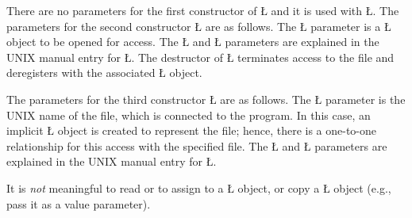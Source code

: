 \documentclass[openright,twoside]{report}
\begin{document}
There are no parameters for the first constructor of \LGinlinetrue\LGbegin\lgrinde\L{}\endlgrinde\LGend{} and it is used with \LGinlinetrue\LGbegin\lgrinde\L{}\endlgrinde\LGend{}.
The parameters for the second constructor \LGinlinetrue\LGbegin\lgrinde\L{}\endlgrinde\LGend{} are as follows.
The \LGinlinetrue\LGbegin\lgrinde\L{}\endlgrinde\LGend{} parameter is a \LGinlinetrue\LGbegin\lgrinde\L{}\endlgrinde\LGend{} object to be opened for access.
The \LGinlinetrue\LGbegin\lgrinde\L{}\endlgrinde\LGend{} and \LGinlinetrue\LGbegin\lgrinde\L{}\endlgrinde\LGend{} parameters are explained in the UNIX manual entry for \LGinlinetrue\LGbegin\lgrinde\L{}\endlgrinde\LGend{}.
The destructor of \LGinlinetrue\LGbegin\lgrinde\L{}\endlgrinde\LGend{} terminates access to the file and deregisters with the associated \LGinlinetrue\LGbegin\lgrinde\L{}\endlgrinde\LGend{} object.

The parameters for the third constructor \LGinlinetrue\LGbegin\lgrinde\L{}\endlgrinde\LGend{} are as follows.
The \LGinlinetrue\LGbegin\lgrinde\L{}\endlgrinde\LGend{} parameter is the UNIX name of the file, which is connected to the program.
In this case, an implicit \LGinlinetrue\LGbegin\lgrinde\L{}\endlgrinde\LGend{} object is created to represent the file;
hence, there is a one-to-one relationship for this access with the specified file.
The \LGinlinetrue\LGbegin\lgrinde\L{}\endlgrinde\LGend{} and \LGinlinetrue\LGbegin\lgrinde\L{}\endlgrinde\LGend{} parameters are explained in the UNIX manual entry for \LGinlinetrue\LGbegin\lgrinde\L{}\endlgrinde\LGend{}.

It is \emph{not} meaningful to read or to assign to a \LGinlinetrue\LGbegin\lgrinde\L{}\endlgrinde\LGend{} object, or copy a \LGinlinetrue\LGbegin\lgrinde\L{}\endlgrinde\LGend{} object (e.g., pass it as a value parameter).
\end{document}
